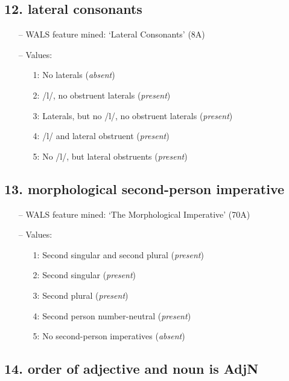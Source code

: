 \subsection*{12. lateral consonants}

\begin{itemize}
\item[--] WALS feature mined: `Lateral Consonants' (8A)
\item[--] Values:

\begin{enumerate}
\item[1:] No laterals (\emph{absent})
\item[2:] /l/, no obstruent laterals (\emph{present})
\item[3:] Laterals, but no /l/, no obstruent laterals (\emph{present})
\item[4:] /l/ and lateral obstruent (\emph{present})
\item[5:] No /l/, but lateral obstruents (\emph{present})
\end{enumerate}
\end{itemize}

\subsection*{13. morphological second-person imperative}

\begin{itemize}
\item[--] WALS feature mined: `The Morphological Imperative' (70A)
\item[--] Values:

\begin{enumerate}
\item[1:] Second singular and second plural (\emph{present})
\item[2:] Second singular (\emph{present})
\item[3:] Second plural (\emph{present})
\item[4:] Second person number-neutral (\emph{present})
\item[5:] No second-person imperatives (\emph{absent})
\end{enumerate}
\end{itemize}

\subsection*{14. order of adjective and noun is AdjN}

